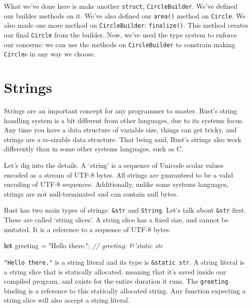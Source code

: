 \documentclass[a4paper,]{book}
\newenvironment{Shaded}{\begin{snugshade}}{\end{snugshade}}
\newcommand{\KeywordTok}[1]{\textcolor[rgb]{0.13,0.29,0.53}{\textbf{{#1}}}}
\newcommand{\StringTok}[1]{\textcolor[rgb]{0.31,0.60,0.02}{{#1}}}
\newcommand{\CommentTok}[1]{\textcolor[rgb]{0.56,0.35,0.01}{\textit{{#1}}}}
\newcommand{\NormalTok}[1]{{#1}}
\begin{document}
What we've done here is make another \texttt{struct},
\texttt{CircleBuilder}. We've defined our builder methods on it. We've
also defined our \texttt{area()} method on \texttt{Circle}. We also made
one more method on \texttt{CircleBuilder}: \texttt{finalize()}. This
method creates our final \texttt{Circle} from the builder. Now, we've
used the type system to enforce our concerns: we can use the methods on
\texttt{CircleBuilder} to constrain making \texttt{Circle}s in any way
we choose.

\hypertarget{sec--strings}{\section{Strings}\label{sec--strings}}

Strings are an important concept for any programmer to master. Rust's
string handling system is a bit different from other languages, due to
its systems focus. Any time you have a data structure of variable size,
things can get tricky, and strings are a re-sizable data structure. That
being said, Rust's strings also work differently than in some other
systems languages, such as C.

Let's dig into the details. A `string' is a sequence of Unicode scalar
values encoded as a stream of UTF-8 bytes. All strings are guaranteed to
be a valid encoding of UTF-8 sequences. Additionally, unlike some
systems languages, strings are not null-terminated and can contain null
bytes.

Rust has two main types of strings: \texttt{\&str} and \texttt{String}.
Let's talk about \texttt{\&str} first. These are called `string slices'.
A string slice has a fixed size, and cannot be mutated. It is a
reference to a sequence of UTF-8 bytes.

\begin{Shaded}
\begin{Highlighting}[]
\KeywordTok{let} \NormalTok{greeting = }\StringTok{"Hello there."}\NormalTok{; }\CommentTok{// greeting: &'static str}
\end{Highlighting}
\end{Shaded}

\texttt{"Hello\ there."} is a string literal and its type is
\texttt{\&\textquotesingle{}static\ str}. A string literal is a string
slice that is statically allocated, meaning that it's saved inside our
compiled program, and exists for the entire duration it runs. The
\texttt{greeting} binding is a reference to this statically allocated
string. Any function expecting a string slice will also accept a string
literal.
\end{document}
